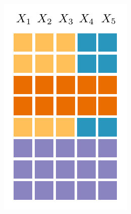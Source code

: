 \documentclass[final]{beamer}
\begin{document}
\begin{frame}{}
\begin{textblock}{60}
{\begin{minipage}[t]{5.67cm}
    \end{minipage}}\hspace{30pt}\begin{minipage}[t]{4.4874cm}
      \includegraphics[width=\linewidth]{figures/grid-2}
    \end{minipage}\hspace{30pt}\raisebox{42pt}{\begin{minipage}[t]{6.48cm}

\end{minipage}}
\end{textblock}
\end{frame}
\end{document}
